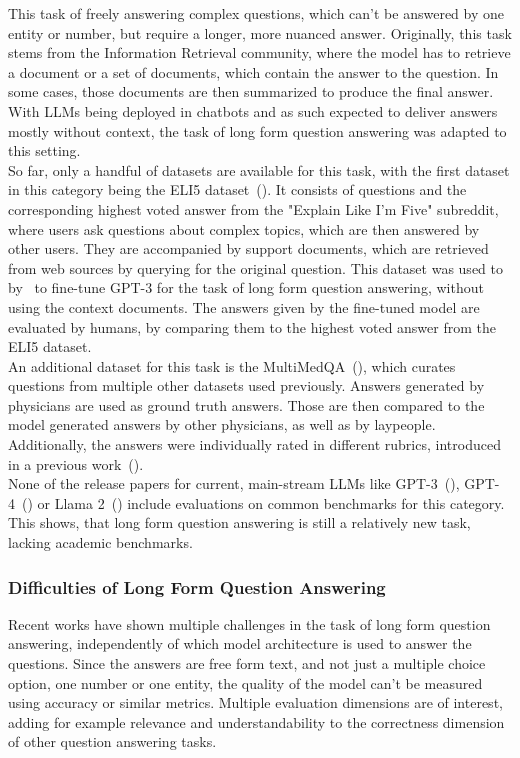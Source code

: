 This task of freely answering complex questions, which can't be answered by one entity or number, but require a longer, more nuanced answer.
Originally, this task stems from the Information Retrieval community, where the model has to retrieve a document or a set of documents, which contain the answer to the question.
In some cases, those documents are then summarized to produce the final answer.
With LLMs being deployed in chatbots and as such expected to deliver answers mostly without context, the task of long form question answering was adapted to this setting.
\\
So far, only a handful of datasets are available for this task, with the first dataset in this category being the ELI5 dataset~(\cite{fan:2019}).
It consists of questions and the corresponding highest voted answer from the "Explain Like I'm Five" subreddit, where users ask questions about complex topics, which are then answered by other users.
They are accompanied by support documents, which are retrieved from web sources by querying for the original question.
This dataset was used to by~\cite{nakano:2021} to fine-tune GPT-3 for the task of long form question answering, without using the context documents.
The answers given by the fine-tuned model are evaluated by humans, by comparing them to the highest voted answer from the ELI5 dataset.
\\ 
An additional dataset for this task is the MultiMedQA~(\cite{singhal:2023}), which curates questions from multiple other datasets used previously. 
Answers generated by physicians are used as ground truth answers.
Those are then compared to the model generated answers by other physicians, as well as by laypeople.
Additionally, the answers were individually rated in different rubrics, introduced in a previous work~(\cite{singhal:2022}).
\\
None of the release papers for current, main-stream LLMs like GPT-3~(\cite{brown:2020}), GPT-4~(\cite{openai:2023}) or Llama 2~(\cite{touvron:2023}) include evaluations on common benchmarks for this category.
This shows, that long form question answering is still a relatively new task, lacking academic benchmarks.

\subsubsection{Difficulties of Long Form Question Answering}\label{sec:long-form-qa-difficulties}

Recent works have shown multiple challenges in the task of long form question answering, independently of which model architecture is used to answer the questions.
Since the answers are free form text, and not just a multiple choice option, one number or one entity, the quality of the model can't be measured using accuracy or similar metrics.
Multiple evaluation dimensions are of interest, adding for example relevance and understandability to the correctness dimension of other question answering tasks.
\\\\  


